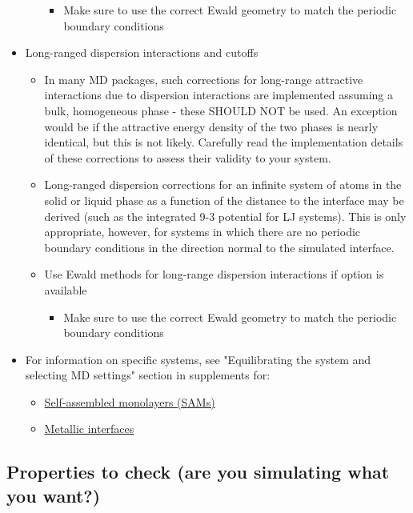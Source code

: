 \documentclass[9pt]{livecoms}
\begin{document}
\begin{itemize}
\begin{itemize}
\begin{itemize}
			\item Make sure to use the correct Ewald geometry to match the periodic boundary conditions
		\end{itemize}
	\end{itemize}
	\item Long-ranged dispersion interactions and cutoffs
	\begin{itemize}
		\item In many MD packages, such corrections for long-range attractive interactions due to dispersion interactions are implemented assuming a bulk, homogeneous phase - these SHOULD NOT be used.  
		An exception would be if the attractive energy density of the two phases is nearly identical, but this is not likely. 
		Carefully read the implementation details of these corrections to assess their validity to your system.
		\item Long-ranged dispersion corrections for an infinite system of atoms in the solid or liquid phase as a function of the distance to the interface may be derived (such as the integrated 9-3 potential for LJ systems). 
		This is only appropriate, however, for systems in which there are no periodic boundary conditions in the direction normal to the simulated interface.
		\item Use Ewald methods for long-range dispersion interactions if option is available
		\begin{itemize}
			\item Make sure to use the correct Ewald geometry to match the periodic boundary conditions
		\end{itemize}
	\end{itemize}
	\item For information on specific systems, see "Equilibrating the system and selecting MD settings" section in supplements for:
	\begin{itemize}
		\item \hyperref[subsec:SAMEq]{Self-assembled monolayers (SAMs)}
		\item \hyperref[subsec:MetEq]{Metallic interfaces}
	\end{itemize}
\end{itemize}


\subsection{Properties to check (are you simulating what you want?)}
\label{subsec:mainCheck}
\end{document}
